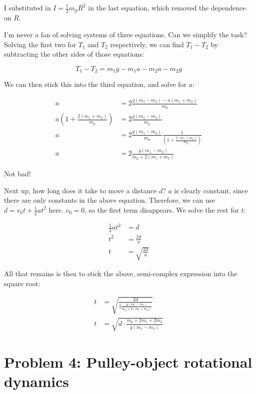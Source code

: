 \documentclass[8.01x]{subfiles}
\begin{document}
I substituted in $\displaystyle I = \frac{1}{2} m_p R^2$ in the last equation, which removed the dependence on $R$.

I'm never a fan of solving systems of three equations. Can we simplify the task? Solving the first two for $T_1$ and $T_2$ respectively, we can find $T_1 - T_2$ by subtracting the other sides of those equations:

\begin{equation}
T_1 - T_2 = m_1 g - m_1 a - m_2 a - m_2 g
\end{equation}

We can then stick this into the third equation, and solve for $a$:

\begin{align}
a &= 2 \frac{g(m_1 - m_2) - a (m_1 + m_2)}{m_p}\\
a \left(1 + \frac{2 (m_1 + m_2)}{m_p}\right) &= 2 \frac{g(m_1 - m_2)}{m_p}\\
a &= 2 \frac{g(m_1 - m_2)}{m_p} \frac{1}{\left(1 + \frac{2 (m_1 + m_2)}{m_p}\right)}\\
a &= 2 \frac{g(m_1 - m_2)}{m_p + 2 (m_1 + m_2)} 
\end{align}

Not bad!

Next up, how long does it take to move a distance $d$? $a$ is clearly constant, since there are only constants in the above equation. Therefore, we can use $\displaystyle d = v_0 t + \frac{1}{2} a t^2$ here. $v_0 = 0$, so the first term disappears. We solve the rest for $t$:

\begin{align}
\frac{1}{2} a t^2 &= d\\
t^2 &= \frac{2 d}{a}\\
t &= \sqrt{\frac{2 d}{a}}
\end{align}

All that remains is then to stick the above, semi-complex expression into the square root:

\begin{align}
t &= \sqrt{\frac{2 d}{2 \frac{g(m_1 - m_2)}{m_p + 2 (m_1 + m_2)}}}\\
t &= \sqrt{d \cdot \frac{m_p + 2 m_1 + 2 m_2}{g(m_1 - m_2)}}
\end{align}

\section{Problem 4: Pulley-object rotational dynamics}
\end{document}
